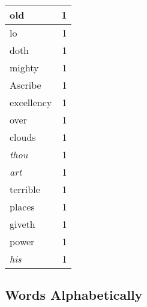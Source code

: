 \begin{center}
\begin{longtable}{l|r}
old & 1 \\ \hline
lo & 1 \\ \hline
doth & 1 \\ \hline
mighty & 1 \\ \hline
Ascribe & 1 \\ \hline
excellency & 1 \\ \hline
over & 1 \\ \hline
clouds & 1 \\ \hline
\emph{thou} & 1 \\ \hline
\emph{art} & 1 \\ \hline
terrible & 1 \\ \hline
places & 1 \\ \hline
giveth & 1 \\ \hline
power & 1 \\ \hline
\emph{his} & 1 \\ \hline
\end{longtable}
\end{center}



\normalsize



\subsection{Words Alphabetically}

